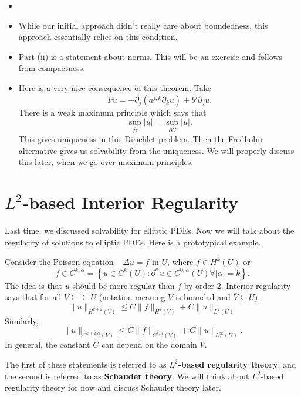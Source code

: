 \begin{remark}
\begin{itemize}
    \item []
    \item While our initial approach didn't really care about boundedness, this approach essentially relies on this condition.
    \item Part (ii) is a statement about norms. This will be an exercise and follows from compactness.
    \item  Here is a very nice consequence of this theorem. Take
    $$
    \widetilde{P} u=-\partial_{j}\left(a^{j, k} \partial_{k} u\right)+b^{j} \partial_{j} u .
    $$
    There is a weak maximum principle which says that
    $$
    \sup _{\bar{U}}|u|=\sup _{\partial U}|u| .
    $$
    This gives uniqueness in this Dirichlet problem. Then the Fredholm alternative gives us solvability from the uniqueness. We will properly discuss this later, when we go over maximum principles.
\end{itemize}
\end{remark}

\newpage 
\section{$L^2$-based Interior Regularity}
Last time, we discussed solvability for elliptic PDEs. Now we will talk about the regularity of solutions to elliptic PDEs. Here is a prototypical example.

\begin{example}
\label{eg: Poisson equation}
 Consider the Poisson equation $-\Delta u=f$ in $U$, where $f \in H^{k}(U)$ or 
 $$
 f\in C^{k, \alpha}=\left\{u \in C^{k}(U): \partial^{\alpha} u \in C^{0, \alpha}(U) \forall|\alpha|=k\right\}.
 $$
 The idea is that $u$ should be more regular than $f$ by order 2. Interior regularity says that for all $V \subseteq \subseteq U$ (notation meaning $V$ is bounded and $\bar{V} \subseteq U)$,
$$
\|u\|_{H^{k+2}(V)} \leq C\|f\|_{H^{k}(V)}+C\|u\|_{L^{2}(U)}
$$
Similarly,
$$
\|u\|_{C^{k+2, \alpha}(V)} \leq C\|f\|_{C^{k, \alpha}(V)}+C\|u\|_{L^{\infty}(U)} .
$$
In general, the constant $C$ can depend on the domain $V$.
\end{example}

The first of these statements is referred to as \textbf{$L^{2}$-based regularity theory}, and the second is referred to as \textbf{Schauder theory}. We will think about $L^{2}$-based regularity theory for now and discuss Schauder theory later.

